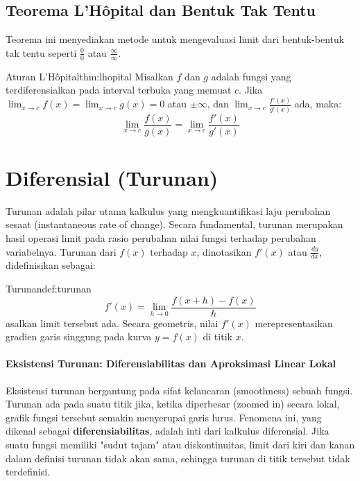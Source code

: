 \documentclass[12pt, a4paper]{article}
\begin{document}
\subsection{Teorema L'Hôpital dan Bentuk Tak Tentu}
Teorema ini menyediakan metode untuk mengevaluasi limit dari bentuk-bentuk tak tentu seperti $\frac{0}{0}$ atau $\frac{\infty}{\infty}$.
\begin{theorem}{Aturan L'Hôpital}{thm:lhopital}
Misalkan $f$ dan $g$ adalah fungsi yang terdiferensialkan pada interval terbuka yang memuat $c$. Jika $\lim_{x \to c} f(x) = \lim_{x \to c} g(x) = 0$ atau $\pm\infty$, dan $\lim_{x \to c} \frac{f'(x)}{g'(x)}$ ada, maka:
\[
\lim_{x \to c} \frac{f(x)}{g(x)} = \lim_{x \to c} \frac{f'(x)}{g'(x)}
\]
\end{theorem}

\section{Diferensial (Turunan)}
Turunan adalah pilar utama kalkulus yang mengkuantifikasi laju perubahan sesaat (instantaneous rate of change). Secara fundamental, turunan merupakan hasil operasi limit pada rasio perubahan nilai fungsi terhadap perubahan variabelnya. Turunan dari $f(x)$ terhadap $x$, dinotasikan $f'(x)$ atau $\frac{dy}{dx}$, didefinisikan sebagai:
\begin{definition}{Turunan}{def:turunan}
\[
f'(x) = \lim_{h \to 0} \frac{f(x+h) - f(x)}{h}
\]
asalkan limit tersebut ada. Secara geometris, nilai $f'(x)$ merepresentasikan gradien garis singgung pada kurva $y=f(x)$ di titik $x$.
\end{definition}

\paragraph{Eksistensi Turunan: Diferensiabilitas dan Aproksimasi Linear Lokal}
Eksistensi turunan bergantung pada sifat kelancaran (smoothness) sebuah fungsi. Turunan ada pada suatu titik jika, ketika diperbesar (zoomed in) secara lokal, grafik fungsi tersebut semakin menyerupai garis lurus. Fenomena ini, yang dikenal sebagai \textbf{diferensiabilitas}, adalah inti dari kalkulus diferensial. Jika suatu fungsi memiliki "sudut tajam" atau diskontinuitas, limit dari kiri dan kanan dalam definisi turunan tidak akan sama, sehingga turunan di titik tersebut tidak terdefinisi.
\end{document}
